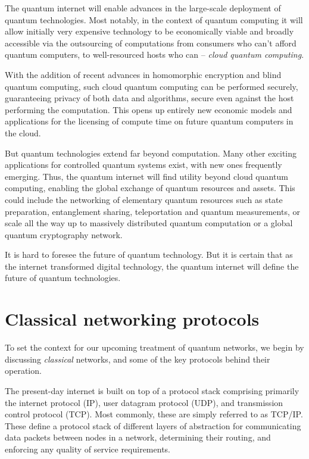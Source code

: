 \documentclass[aps,rmp,twocolumn,amsmath,amssymb,nofootinbib,superscriptaddress]{revtex4}
\begin{document}
The quantum internet will enable advances in the large-scale deployment of quantum technologies. Most notably, in the context of quantum computing it will allow initially very expensive technology to be economically viable and broadly accessible via the outsourcing of computations from consumers who can't afford quantum computers, to well-resourced hosts who can -- \emph{cloud quantum computing}.

With the addition of recent advances in homomorphic encryption and blind quantum computing, such cloud quantum computing can be performed securely, guaranteeing privacy of both data and algorithms, secure even against the host performing the computation. This opens up entirely new economic models and applications for the licensing of compute time on future quantum computers in the cloud.

But quantum technologies extend far beyond computation. Many other exciting applications for controlled quantum systems exist, with new ones frequently emerging. Thus, the quantum internet will find utility beyond cloud quantum computing, enabling the global exchange of quantum resources and assets. This could include the networking of elementary quantum resources such as state preparation, entanglement sharing, teleportation and quantum measurements, or scale all the way up to massively distributed quantum computation or a global quantum cryptography network.

It is hard to foresee the future of quantum technology. But it is certain that as the internet transformed digital technology, the quantum internet will define the future of quantum technologies.

%
%

\section{Classical networking protocols}

To set the context for our upcoming treatment of quantum networks, we begin by discussing \emph{classical} networks, and some of the key protocols behind their operation.

The present-day internet is built on top of a protocol stack comprising primarily the internet protocol (IP), user datagram protocol (UDP), and transmission control protocol (TCP). Most commonly, these are simply referred to as TCP/IP. These define a protocol stack of different layers of abstraction for communicating data packets between nodes in a network, determining their routing, and enforcing any quality of service requirements.
\end{document}
